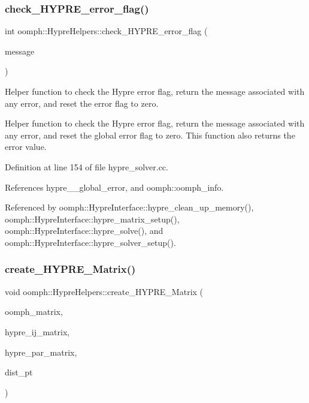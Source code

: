 \subsubsection{\texorpdfstring{check\+\_\+\+H\+Y\+P\+R\+E\+\_\+error\+\_\+flag()}{check\_HYPRE\_error\_flag()}}
{\footnotesize\ttfamily int oomph\+::\+Hypre\+Helpers\+::check\+\_\+\+H\+Y\+P\+R\+E\+\_\+error\+\_\+flag (\begin{DoxyParamCaption}\item[{std\+::ostringstream \&}]{message }\end{DoxyParamCaption})}



Helper function to check the Hypre error flag, return the message associated with any error, and reset the error flag to zero. 

Helper function to check the Hypre error flag, return the message associated with any error, and reset the global error flag to zero. This function also returns the error value. 

Definition at line 154 of file hypre\+\_\+solver.\+cc.



References hypre\+\_\+\+\_\+global\+\_\+error, and oomph\+::oomph\+\_\+info.



Referenced by oomph\+::\+Hypre\+Interface\+::hypre\+\_\+clean\+\_\+up\+\_\+memory(), oomph\+::\+Hypre\+Interface\+::hypre\+\_\+matrix\+\_\+setup(), oomph\+::\+Hypre\+Interface\+::hypre\+\_\+solve(), and oomph\+::\+Hypre\+Interface\+::hypre\+\_\+solver\+\_\+setup().

\mbox{\label{namespaceoomph_1_1HypreHelpers_a3c7d0df9c9c2ce939e071a16716d7734}} 
\subsubsection{\texorpdfstring{create\+\_\+\+H\+Y\+P\+R\+E\+\_\+\+Matrix()}{create\_HYPRE\_Matrix()}}
{\footnotesize\ttfamily void oomph\+::\+Hypre\+Helpers\+::create\+\_\+\+H\+Y\+P\+R\+E\+\_\+\+Matrix (\begin{DoxyParamCaption}\item[{\hyperlink{classoomph_1_1CRDoubleMatrix}{C\+R\+Double\+Matrix} $\ast$}]{oomph\+\_\+matrix,  }\item[{H\+Y\+P\+R\+E\+\_\+\+I\+J\+Matrix \&}]{hypre\+\_\+ij\+\_\+matrix,  }\item[{H\+Y\+P\+R\+E\+\_\+\+Par\+C\+S\+R\+Matrix \&}]{hypre\+\_\+par\+\_\+matrix,  }\item[{\hyperlink{classoomph_1_1LinearAlgebraDistribution}{Linear\+Algebra\+Distribution} $\ast$}]{dist\+\_\+pt }\end{DoxyParamCaption})}



